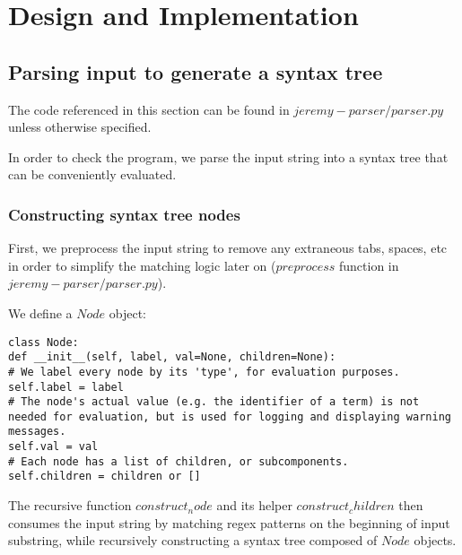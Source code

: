 
\chapter{Design and Implementation} %



\label{design-and-implementation} %


\section{Parsing input to generate a syntax tree}

The code referenced in this section can be found in $jeremy-parser/parser.py$ unless otherwise specified.

In order to check the program, we parse the input string into a syntax tree that can be conveniently evaluated.

\subsection{Constructing syntax tree nodes}
First, we preprocess the input string to remove any extraneous tabs, spaces, etc in order to simplify the matching logic later on ($preprocess$ function in $jeremy-parser/parser.py$).


We define a $Node$ object:
\begin{lstlisting}
class Node:
def __init__(self, label, val=None, children=None):
# We label every node by its 'type', for evaluation purposes.
self.label = label
# The node's actual value (e.g. the identifier of a term) is not needed for evaluation, but is used for logging and displaying warning messages.
self.val = val
# Each node has a list of children, or subcomponents.
self.children = children or []
\end{lstlisting}

The recursive function $construct_node$ and its helper $construct_children$ then consumes the input string by matching regex patterns on the beginning of input substring, while recursively constructing a syntax tree composed of $Node$ objects.


